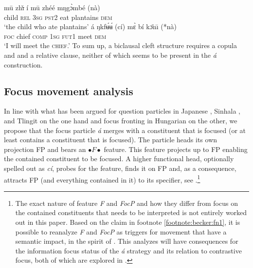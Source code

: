 \documentclass[output=paper,
modfonts
]{langscibook}
\begin{document}
\ea \label{ex:becker:s5}
\gll m\=u zh\sout{\v{\i}} \'i m\=u zh\'e\'e mŋg\`ɔmb\'e ({n\`a}) \\  
     child \textsc{rel} \textsc{3sg} \textsc{pst2} eat plantains \textsc{dem} \\ 
\glt `the child who ate plantains'
\z
\ea \label{ex:becker:s6}
\gll \'{a} {ŋkf\'ʉ\'ʉ} (c\'{i}) m\`ɛ b\'{i} k\=ɔn\={\i} (*{n\`a}) \\  
     \textsc{foc} {chief} \textsc{comp} \textsc{1sg} \textsc{fut1} meet \textsc{dem} \\ 
\glt `I will meet the \textsc{\MakeLowercase{CHIEF}}.'
\z
To sum up, a biclausal cleft structure requires a copula and and a relative clause, neither of which seems to be present in the {\em \'a} construction.

\subsection{Focus movement analysis} \label{sec:becker:subsec:analysis}
In line with what has been argued for question particles in Japanese \citep{Hagstrom1998}, Sinhala \citep{Kishimoto2005}, and Tlingit \citep{Cable2010} on the one hand and focus fronting in Hungarian \citep{Horvath2007,Horvath2010,Horvath2013} on the other, we propose that the focus particle {\em \'a} merges with a constituent that is focused (or at least contains a constituent that is focused). The particle heads its own projection FP and bears an {\small $\bullet F \bullet$} feature. This feature projects up to FP enabling the contained constituent to be focused. A higher functional head, optionally spelled out as {\em c\'i}, probes for the feature, finds it on FP and, as a consequence, attracts FP (and everything contained in it) to its specifier, see .\footnote{The exact nature of feature {\em F} and {\em FocP} and how they differ from focus on the contained constituents that needs to be interpreted is not entirely worked out in this paper. Based on the claim in footnote \ref{footnote:becker:fn1}, it is possible to reanalyze {\em F} and {\em FocP} as triggers for movement that have a semantic impact, in the spirit of \citet{Horvath2007,Horvath2013}. This analyzes will have consequences for the information focus status of the {\em \'a} strategy and its relation to {contrastive focus}, both of which are explored in \citet{Driemeletal2018, DriemelNformi2018}.}\largerpage
\end{document}
